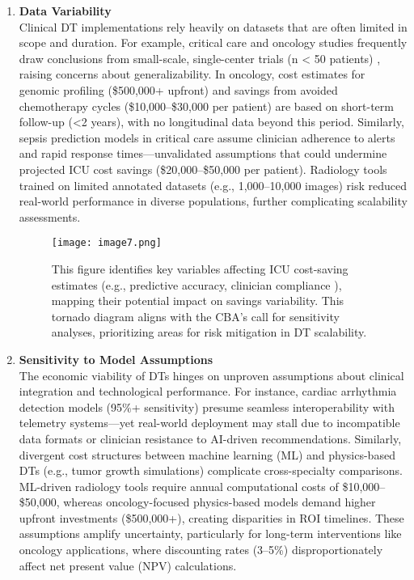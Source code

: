 \documentclass[10pt,a4paper]{article}
\begin{document}
\begin{enumerate}
    \item \textbf{Data Variability} \\
    Clinical DT implementations rely heavily on datasets that are often limited in scope and duration. For example, critical care and oncology studies frequently draw conclusions from small-scale, single-center trials (n < 50 patients) \cite{Mascret2024, Wang2025}, raising concerns about generalizability. In oncology, cost estimates for genomic profiling (\$500,000+ upfront) and savings from avoided chemotherapy cycles (\$10,000–\$30,000 per patient) are based on short-term follow-up (<2 years), with no longitudinal data beyond this period. Similarly, sepsis prediction models in critical care \cite{Mascret2024} assume clinician adherence to alerts and rapid response times—unvalidated assumptions that could undermine projected ICU cost savings (\$20,000–\$50,000 per patient). Radiology tools \cite{Bocean2025} trained on limited annotated datasets (e.g., 1,000–10,000 images) risk reduced real-world performance in diverse populations, further complicating scalability assessments.

    \begin{figure} [H]
        \centering
        \texttt{[image: image7.png]}
        \caption{This figure identifies key variables affecting ICU cost-saving estimates (e.g., predictive accuracy, clinician compliance \cite{Mascret2024}), mapping their potential impact on savings variability. This tornado diagram aligns with the CBA’s call for sensitivity analyses, prioritizing areas for risk mitigation in DT scalability.}
        \label{fig:plot6}
    \end{figure}

    \item \textbf{Sensitivity to Model Assumptions} \\
    The economic viability of DTs hinges on unproven assumptions about clinical integration and technological performance. For instance, cardiac arrhythmia detection models (95\%+ sensitivity) \cite{Ahmed2023} presume seamless interoperability with telemetry systems—yet real-world deployment may stall due to incompatible data formats or clinician resistance to AI-driven recommendations. Similarly, divergent cost structures between machine learning (ML) and physics-based DTs (e.g., tumor growth simulations) \cite{Wang2025, Bocean2025} complicate cross-specialty comparisons. ML-driven radiology tools require annual computational costs of \$10,000–\$50,000, whereas oncology-focused physics-based models demand higher upfront investments (\$500,000+), creating disparities in ROI timelines. These assumptions amplify uncertainty, particularly for long-term interventions like oncology applications, where discounting rates (3–5\%) disproportionately affect net present value (NPV) calculations.


\end{enumerate}
\end{document}

